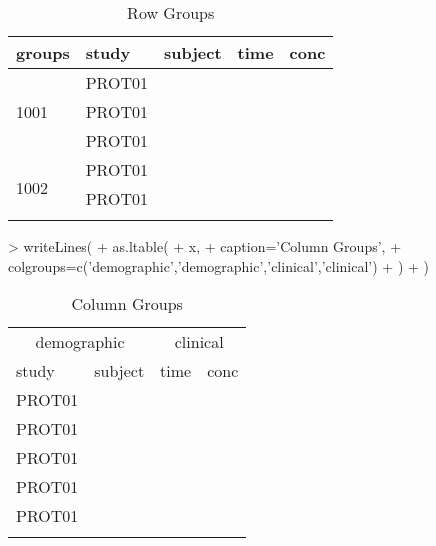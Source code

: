 \documentclass[titlepage]{article}
\begin{document}
\begin{Schunk}
\begin{table}[H]
 \caption[Row Groups]{Row Groups }
 \begin{center}
  \begin{tabular}{l||lrrr}
    \hline \hline
   groups & study & subject & time & conc \\ \hline
   \multirow{3}{*}{1001} & PROT01 & \verb#1001# & \verb#0# & \verb#0.12# \\
                          & PROT01 & \verb#1001# & \verb#1# & \verb#34.00# \\
                          & PROT01 & \verb#1001# & \verb#2# & \verb#5.60# \\
   \multirow{3}{*}{1002} & PROT01 & \verb#1002# & \verb#0# & \verb#0.50# \\
                          & PROT01 & \verb#1002# & \verb#1# & \verb#200.00# \\
                          &  & \verb#1002# & \verb#2# & \verb## \\ \hline
  \end{tabular}
 \end{center}
\end{table}\end{Schunk}
\begin{Schunk}
\begin{Sinput}
> writeLines(
+   as.ltable(
+     x,
+     caption='Column Groups',
+     colgroups=c('demographic','demographic','clinical','clinical')
+   )
+ )
\end{Sinput}
\begin{table}[H]
 \caption[Column Groups]{Column Groups }
 \begin{center}
  \begin{tabular}{lrrr}
    \hline \hline
   \multicolumn{2}{c}{demographic} & \multicolumn{2}{c}{clinical} \\
   study & subject & time & conc \\ \hline
   PROT01 & \verb#1001# & \verb#0# & \verb#0.12# \\
   PROT01 & \verb#1001# & \verb#1# & \verb#34.00# \\
   PROT01 & \verb#1001# & \verb#2# & \verb#5.60# \\
   PROT01 & \verb#1002# & \verb#0# & \verb#0.50# \\
   PROT01 & \verb#1002# & \verb#1# & \verb#200.00# \\
    & \verb#1002# & \verb#2# & \verb## \\ \hline
  \end{tabular}
 \end{center}
\end{table}\end{Schunk}
\end{document}
